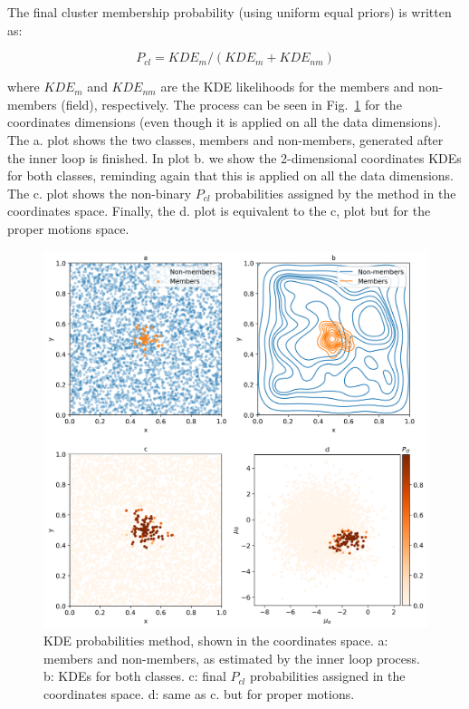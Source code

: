 \documentclass[draft]{aa}
\begin{document}
 The final cluster membership probability (using uniform equal priors) is
 written as:

 \begin{equation}
 P_{cl} = KDE_{m} / (KDE_{m} + KDE_{nm})
 \end{equation}

 \noindent where $KDE_{m}$ and $KDE_{nm}$ are the KDE likelihoods for the
 members and non-members (field), respectively. The process can be seen in
 Fig.~\ref{fig:KDE} for the coordinates dimensions (even though it is applied
 on all the data dimensions). The a. plot shows the two classes, members and
 non-members, generated after the inner loop is finished. In plot b. we show
 the 2-dimensional coordinates KDEs for both classes, reminding again that this
 is applied on all the data dimensions. The c. plot shows the
 non-binary $P_{cl} $ probabilities assigned by the method in the coordinates
 space. Finally, the d. plot is equivalent to the c, plot but for the proper
 motions space.
 
  \begin{figure}
  \includegraphics[width=\hsize]{figs/KDE.png}
  \caption{KDE probabilities method, shown in the coordinates space. a:
  members and non-members, as estimated by the inner loop process. b:
  KDEs for both classes. c: final $P_{cl} $ probabilities assigned in the
  coordinates space. d: same as c. but for proper motions.}
  \label{fig:KDE}
  \end{figure}
\end{document}
